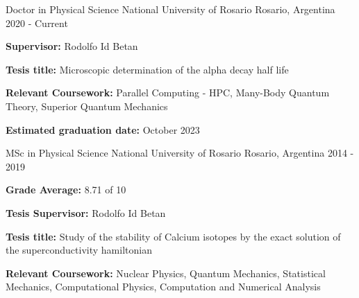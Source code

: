 

\begin{cventries}

  \cventry
    {Doctor in Physical Science} %
    {National University of Rosario} %
    {Rosario, Argentina} %
    {2020 - Current} %
    {
      \begin{cvitems} %
        \item {\textbf{Supervisor:} Rodolfo Id Betan}
        \item {\textbf{Tesis title:} Microscopic determination of the alpha decay half life}
        \item {\textbf{Relevant Coursework:} Parallel Computing - HPC, Many-Body Quantum Theory, Superior Quantum Mechanics }
        \item {\textbf{Estimated graduation date:} October 2023}
      \end{cvitems}
    }
  \cventry
    {MSc in Physical Science} %
    {National University of Rosario} %
    {Rosario, Argentina} %
    {2014 - 2019} %
    {
      \begin{cvitems} %
        \item {\textbf{Grade Average:} 8.71 of 10}
        \item {\textbf{Tesis Supervisor:} Rodolfo Id Betan}
        \item {\textbf{Tesis title:} Study of the stability of Calcium isotopes by the exact solution of the superconductivity hamiltonian}
        \item {\textbf{Relevant Coursework:} Nuclear Physics, Quantum Mechanics,  Statistical Mechanics, Computational Physics, Computation and Numerical Analysis}
      \end{cvitems}
    }
\end{cventries}
